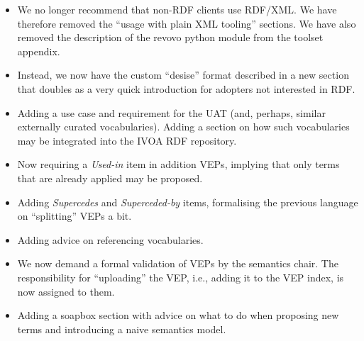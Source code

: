 \documentclass[11pt,a4paper]{ivoa}
\begin{document}
\begin{itemize}
\item We no longer recommend that non-RDF clients use RDF/XML.  We have
therefore removed the ``usage with plain XML tooling'' sections.  We
have also removed the description of the revovo python module from the
toolset appendix.

\item Instead, we now have the custom ``desise'' format described in a
new section that doubles as a very quick introduction for adopters not
interested in RDF.

\item Adding a use case and requirement for the UAT (and, perhaps,
similar externally curated vocabularies).  Adding a section on how
such vocabularies may be integrated into the IVOA RDF repository.

\item Now requiring a \emph{Used-in} item in addition VEPs, implying
that only terms that are already applied may be proposed.

\item Adding \emph{Supercedes} and \emph{Superceded-by} items,
formalising the previous language on ``splitting'' VEPs a bit.

\item Adding advice on referencing vocabularies.

\item We now demand a formal validation of VEPs by the semantics chair.
The responsibility for ``uploading'' the VEP, i.e., adding it to the VEP
index, is now assigned to them.

\item Adding a soapbox section with advice on what to do when proposing
new terms and introducing a naive semantics model.
\end{itemize}


\end{document}

